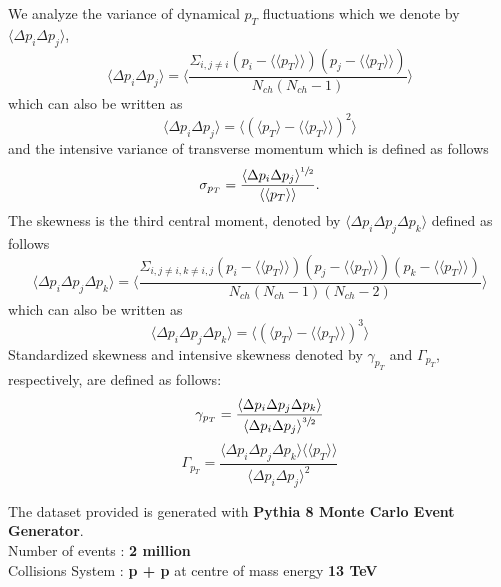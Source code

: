 \documentclass[letterpaper,aps,prc,superscriptaddress,nofootinbib,10pt,showpacs,floatfix]{revtex4-2}%
\newcommand{\bfrac}[2]{\frac{\displaystyle #1}{\displaystyle #2}}
\begin{document}
We analyze the variance of dynamical $p_T$ fluctuations which we denote by $\langle \Delta p_i \Delta p_j\rangle $,
\begin{equation}
\label{eq:2}
\langle \Delta p_i \Delta p_j \rangle =\langle \bfrac{\Sigma_{i,j\neq i} {(p_i-\langle \langle p_T\rangle \rangle )(p_j-\langle \langle p_T\rangle \rangle )}}{N_{ch}(N_{ch}-1)}\rangle 
\end{equation}
which can also be written as
\begin{equation}
\label{eq:3}
\langle \Delta p_i \Delta p_j\rangle =\langle \left(\langle p_T\rangle -\langle \langle p_T\rangle \rangle \right)^2\rangle 
\end{equation}
and the intensive variance of transverse momentum which is defined as follows
\begin{equation}
\label{eq:4}
\sigma_{p_T}=\bfrac{\langle \Delta p_i \Delta p_j\rangle ^{\sfrac{1}{2}}}{\langle \langle p_T\rangle \rangle }.
\end{equation}
The skewness is the third central moment, denoted by $\langle \Delta p_i \Delta p_j \Delta p_k\rangle $ defined as follows
\begin{equation}
\label{eq:5}
\langle \Delta p_i \Delta p_j \Delta p_k\rangle =\langle \bfrac{\Sigma_{i,j\neq i, k\neq i,j} {(p_i-\langle \langle p_T\rangle \rangle )(p_j-\langle \langle p_T\rangle \rangle )(p_k-\langle \langle p_T\rangle \rangle )}}{N_{ch}(N_{ch}-1)(N_{ch}-2)}\rangle 
\end{equation}
which can also be written as
\begin{equation}
\label{eq:6}
\langle \Delta p_i \Delta p_j \Delta p_k \rangle =\langle \left(\langle p_T\rangle -\langle \langle p_T\rangle \rangle \right)^3\rangle 
\end{equation}
Standardized skewness and intensive skewness denoted by $\gamma_{p_T}$ and $\Gamma_{p_T}$, respectively, are defined as follows:
\begin{equation}
\label{eq:7}
\gamma_{p_T}=\bfrac{\langle \Delta p_i \Delta p_j \Delta p_k\rangle }{\langle \Delta p_i \Delta p_j\rangle ^{\sfrac{3}{2}}}
\end{equation}
\begin{equation}
\label{eq:8}
\Gamma_{p_T}= \bfrac{\langle \Delta p_i \Delta p_j \Delta p_k\rangle \langle \langle p_T\rangle \rangle }{\langle \Delta p_i \Delta p_j\rangle ^2}
\end{equation}


The dataset provided is generated with \textbf{Pythia 8 Monte Carlo Event Generator}. \\
Number of events :  \textbf{2 million} \\
Collisions System :  \textbf{p + p} at centre of mass energy \textbf{13 TeV}\\
\end{document}
